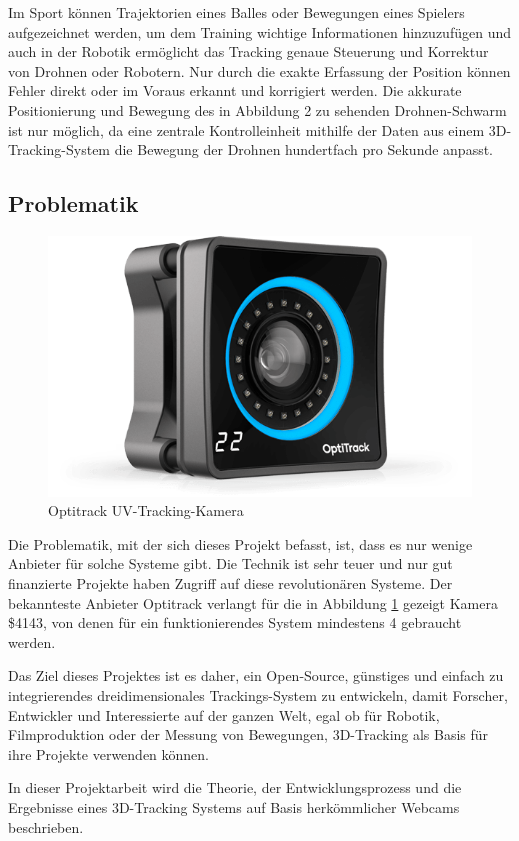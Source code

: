 \documentclass[12pt, ngerman]{article}
\begin{document}
Im Sport können Trajektorien eines Balles oder Bewegungen eines Spielers aufgezeichnet werden, um dem Training wichtige Informationen hinzuzufügen und auch in der Robotik ermöglicht das Tracking genaue Steuerung und Korrektur von Drohnen oder Robotern. Nur durch die exakte Erfassung der Position können Fehler direkt oder im Voraus erkannt und korrigiert werden. Die akkurate Positionierung und Bewegung des in Abbildung 2 zu sehenden Drohnen-Schwarm ist nur möglich, da eine zentrale Kontrolleinheit mithilfe der Daten aus einem 3D-Tracking-System die Bewegung der Drohnen hundertfach pro Sekunde anpasst. 
\subsection{Problematik}
\begin{figure}
\centering
  \vspace{-40pt}
  {\setlength{\belowcaptionskip}{-20pt}
    \includegraphics[angle=0,width=\linewidth]{4143.png}
    \caption{Optitrack UV-Tracking-Kamera}
    \label{Abb: optitrack}
  }
\end{figure}
Die Problematik, mit der sich dieses Projekt befasst, ist, dass es nur wenige Anbieter für solche Systeme gibt. Die Technik ist sehr teuer und nur gut finanzierte Projekte haben Zugriff auf diese revolutionären Systeme. Der bekannteste Anbieter Optitrack verlangt für die in Abbildung \ref{Abb: optitrack} gezeigt Kamera \$4143, von denen für ein funktionierendes System mindestens 4 gebraucht werden. 

Das Ziel dieses Projektes ist es daher, ein Open-Source, günstiges und einfach zu integrierendes dreidimensionales Trackings-System zu entwickeln, damit Forscher, Entwickler und Interessierte auf der ganzen Welt, egal ob für Robotik, Filmproduktion oder der Messung von Bewegungen, 3D-Tracking als Basis für ihre Projekte verwenden können. \par
In dieser Projektarbeit wird die Theorie, der Entwicklungsprozess und die Ergebnisse eines 3D-Tracking Systems auf Basis herkömmlicher Webcams beschrieben.  
\newpage
\end{document}
